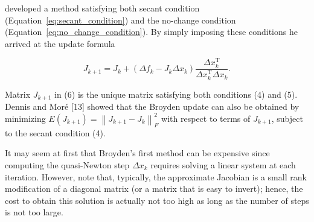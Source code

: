 \cite{broyden} developed a method satisfying both secant condition (Equation~\eqref{eq:secant_condition}) and the no-change condition (Equation~\eqref{eq:no_change_condition}). 
By simply imposing these conditions he arrived at the update formula
\begin{highlight}
\begin{equation} \label{eq:good_update_broyden}
J_{k+1}=J_{k}+\left(\Delta f_{k}-J_{k} \Delta x_{k}\right) \frac{\Delta x_{k}^{\mathrm{T}}}{\Delta x_{k}^{\mathrm{T}} \Delta x_{k}}.
\end{equation}
\end{highlight}

Matrix \(J_{k+1}\) in (6) is the unique matrix satisfying both conditions (4) and (5). Dennis and Moré [13] showed that the Broyden update can also be obtained by minimizing \(E\left(J_{k+1}\right)=\left\|J_{k+1}-J_{k}\right\|_{F}^{2}\) with respect to terms of \(J_{k+1}\), subject to the secant condition (4).

It may seem at first that Broyden's first method can be expensive since computing the quasi-Newton step \(\Delta x_{k}\) requires solving a linear system at each iteration. 
However, note that, typically, the approximate Jacobian is a small rank modification of a diagonal matrix (or a matrix that is easy to invert); hence, the cost to obtain this solution is actually not too high as long as the number of steps is not too large.

